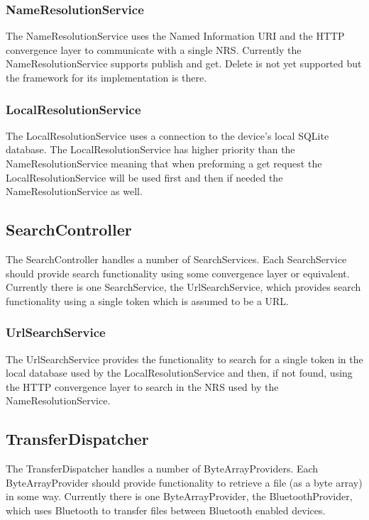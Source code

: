 \subsubsection{NameResolutionService}

The NameResolutionService uses the Named Information URI \cite{ninames} and the HTTP convergence layer \cite{netinfproto} to communicate with a single NRS. Currently the NameResolutionService supports publish and get. Delete is not yet supported but the framework for its implementation is there.

\subsubsection{LocalResolutionService}

The LocalResolutionService uses a connection to the device's local SQLite database. The LocalResolutionService has higher priority than the NameResolutionService meaning that when preforming a get request the LocalResolutionService will be used first and then if needed the NameResolutionService as well.

\subsection{SearchController}
\label{sec:SearchController}

The SearchController handles a number of SearchServices. Each SearchService should provide search functionality 
using some convergence layer or equivalent. Currently there is one SearchService, the UrlSearchService, 
which provides search functionality using a single token which is assumed to be a URL.

\subsubsection{UrlSearchService}

The UrlSearchService provides the functionality to search for a single token in the local database 
used by the LocalResolutionService and then, if not found, using the HTTP convergence layer to search 
in the NRS used by the NameResolutionService.

\subsection{TransferDispatcher}
\label{sec:TransferDispatcher}

The TransferDispatcher handles a number of ByteArrayProviders. Each ByteArrayProvider should provide functionality to retrieve a file (as a byte array) in some way. Currently there is one ByteArrayProvider, the BluetoothProvider, which uses Bluetooth to transfer files between Bluetooth enabled devices.

